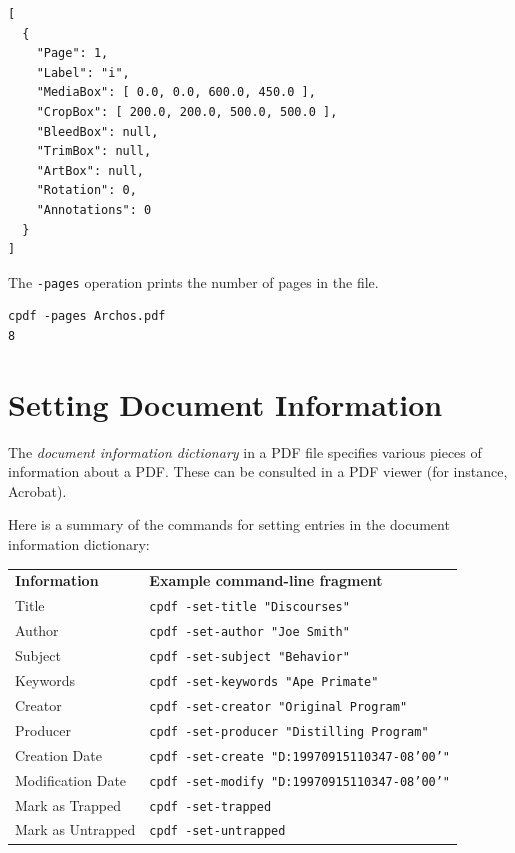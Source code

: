 \documentclass{book}
\newcommand{\smallgap}{\bigskip}
\begin{document}
\begin{framed}
{\small\begin{verbatim}
[
  {
    "Page": 1,
    "Label": "i",
    "MediaBox": [ 0.0, 0.0, 600.0, 450.0 ],
    "CropBox": [ 200.0, 200.0, 500.0, 500.0 ],
    "BleedBox": null,
    "TrimBox": null,
    "ArtBox": null,
    "Rotation": 0,
    "Annotations": 0
  }
]
\end{verbatim}}
\end{framed}

\smallgap 
\noindent The \texttt{-pages} operation prints the number of pages in the file.
\begin{framed}
{\small\begin{verbatim}
cpdf -pages Archos.pdf
8
\end{verbatim}}
\end{framed}

\section{Setting Document Information}
\label{setdocinfo}
  The \textit{document information dictionary} in a PDF file specifies various
pieces of information about a PDF. These can be consulted in a PDF viewer (for
instance, Acrobat).

  Here is a summary of the commands for setting entries in the document
information dictionary:

{\small\begin{framed}
    \noindent\begin{tabular}{ll}
       \textbf{Information} & \textbf{Example command-line fragment} \\
       Title & \texttt{cpdf -set-title "Discourses"} \\
       Author & \texttt{cpdf -set-author "Joe Smith"} \\
       Subject & \texttt{cpdf -set-subject "Behavior"} \\
       Keywords & \texttt{cpdf -set-keywords "Ape Primate"} \\
       Creator & \texttt{cpdf -set-creator "Original Program"} \\
       Producer & \texttt{cpdf -set-producer "Distilling Program"} \\
       Creation Date & \texttt{cpdf -set-create "D:19970915110347-08'00'"} \\
       Modification Date & \texttt{cpdf -set-modify "D:19970915110347-08'00'"} \\
       Mark as Trapped & \texttt{cpdf -set-trapped} \\
       Mark as Untrapped & \texttt{cpdf -set-untrapped} \\
    \end{tabular}
\end{framed}}
\end{document}
